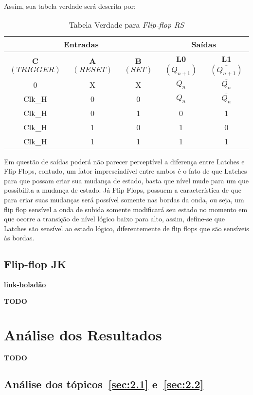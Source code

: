 \documentclass[12pt]{article}
\begin{document}
Assim, sua tabela verdade será descrita por:
\begin{table}[H]
    \centering
    \caption{Tabela Verdade para \emph{Flip-flop RS}}
    \begin{tabular}{|c|c|c||c|c|}\hline
      \multicolumn{3}{|c||}{Entradas} & \multicolumn{2}{|c|}{Saídas} \\\hline
      \textbf{C $({TRIGGER})$} & \textbf{A $({RESET})$} & \textbf{B $({SET})$} & \textbf{L0 $(Q_{n+1})$} & \textbf{L1 $(\overline{Q_{n+1}})$} \\\hline
      0 & X & X & $Q_{n}$ & $\overline{Q_{n}}$ \\\hline
      Clk_H & 0 & 0 & $Q_{n}$ & $\overline{Q_{n}}$\\\hline
      Clk_H & 0 & 1 & 0 & 1\\\hline
      Clk_H & 1 & 0 & 1 & 0 \\\hline
      Clk_H & 1 & 1 & 1 & 1 \\\hline
    \end{tabular}\label{tab:truth_table_flipflop_rs}
\end{table}

Em questão de saídas poderá não parecer perceptível a diferença entre Latches e
Flip Flops, contudo, um fator imprescindível entre ambos é o fato de que Latches
para que possam criar sua mudança de estado, basta que nível mude para um que
possibilita a mudança de estado. Já Flip Flops, possuem a característica de que
para criar suas mudanças será possível somente nas bordas da onda, ou seja, um
flip flop sensível a onda de subida somente modificará seu estado no momento em
que ocorre a transição de nível lógico baixo para alto, assim, define-se que
Latches são sensível ao estado lógico, diferentemente de flip flops que são
sensíveis às bordas.

\subsection{Flip-flop JK}\label{sec:2.4}

\href{link-boladão}{\textbf{link-boladão}}

\textbf{TODO}

\section{Análise dos Resultados}\label{sec:resultados}

\textbf{TODO}

\subsection{Análise dos tópicos~\ref{sec:2.1} e~\ref{sec:2.2}}\label{sec:analise2.1}
\end{document}
